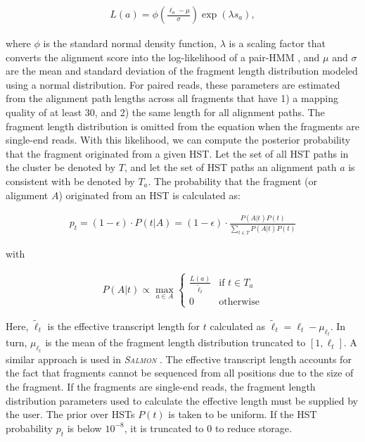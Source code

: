 \documentclass[11pt]{ucthesis}
\newcommand{\tool}[1]{\emph{\textsc{#1}}}
\begin{document}
\begin{align}
    L(a)= \phi\left(\frac{\ell_a - \mu}{\sigma}\right)\exp\left(\lambda s_a\right),
\end{align}
 
\noindent where $\phi$ is the standard normal density function, $\lambda$ is a scaling factor that converts the alignment score into the log-likelihood of a pair-HMM \cite{karlin1990methods}, and $\mu$ and $\sigma$ are the mean and standard deviation of the fragment length distribution modeled using a normal distribution. For paired reads, these parameters are estimated from the alignment path lengths across all fragments that have 1) a mapping quality of at least 30, and 2) the same length for all alignment paths. The fragment length distribution is omitted from the equation when the fragments are single-end reads. With this likelihood, we can compute the posterior probability that the fragment originated from a given HST. Let the set of all HST paths in the cluster be denoted by $T$, and let the set of HST paths an alignment path $a$ is consistent with be denoted by $T_a$. The probability that the fragment (or alignment $A$) originated from an HST is calculated as:


\begin{align}
    p_t=(1-\epsilon)\cdot P(t|A)=(1-\epsilon)\cdot\frac{P(A|t)P(t)}{\sum_{t\in T}P(A|t)P(t)}
\end{align}

\noindent with

\begin{align}
    P(A|t)\propto\max_{a\in A}\begin{cases}\frac{L(a)}{\widetilde{\ell}_t} & \mbox{if }t\in T_a\\0 & \mbox{otherwise}\end{cases}
\end{align}


\noindent Here, $\widetilde{\ell}_t$ is the effective transcript length for $t$ calculated as ${\widetilde{\ell}_t=\ell_t-\mu_{\ell_t}}$. In turn, $\mu_{\ell_t}$ is the mean of the fragment length distribution truncated to ${[1,\ell_t]}$. A similar approach is used in \tool{Salmon} \cite{patro2017salmon}. The effective transcript length accounts for the fact that fragments cannot be sequenced from all positions due to the size of the fragment. If the fragments are single-end reads, the fragment length distribution parameters used to calculate the effective length must be supplied by the user. The prior over HSTs $P(t)$ is taken to be uniform. If the HST probability $p_t$ is below $10^{-8}$, it is truncated to 0 to reduce storage. 
\end{document}
